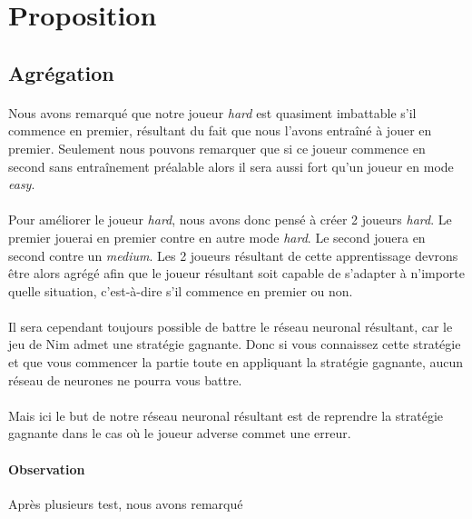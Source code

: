 \documentclass{article}
\begin{document}
\newpage

\section{Proposition}
  \subsection{Agrégation}
  \paragraph{} 
    Nous avons remarqué que notre joueur \emph{hard} est quasiment imbattable s'il commence en premier,
    résultant du fait que nous l'avons entraîné à jouer en premier. Seulement nous pouvons remarquer que si ce joueur commence 
    en second sans entraînement préalable alors il sera aussi fort qu'un joueur en mode \emph{easy}.
  \paragraph{}
    Pour améliorer le joueur \emph{hard}, nous avons donc pensé à créer 2 joueurs \emph{hard}. Le premier jouerai en premier contre en autre
    mode \emph{hard}. Le second jouera en second contre un \emph{medium}. Les 2 joueurs résultant de cette apprentissage devrons être alors 
    agrégé afin que le joueur résultant soit capable de s'adapter à n'importe quelle situation, c'est-à-dire s'il commence en premier ou non.
  \paragraph{}
    Il sera cependant toujours possible de battre le réseau neuronal résultant, car le jeu de Nim admet une stratégie gagnante. Donc si vous connaissez cette stratégie
    et que vous commencer la partie toute en appliquant la stratégie gagnante, aucun réseau de neurones ne pourra vous battre.
  \paragraph{}
    Mais ici le but de notre réseau neuronal résultant est de reprendre la stratégie gagnante dans le cas où le joueur adverse commet une erreur.
    
  \paragraph{Observation}
    Après plusieurs test, nous avons remarqué
    
\end{document}
